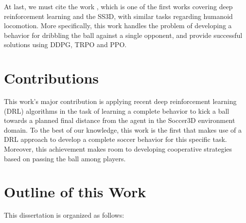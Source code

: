 At last, we must cite the work \cite{TGMuzio}, which is one of the first works covering deep reinforcement learning and the SS3D, with similar tasks regarding humanoid locomotion. More specifically, this work handles the problem of developing a behavior for dribbling the ball against a single opponent, and provide successful solutions using DDPG, TRPO and PPO.

\section{Contributions}

This work's major contribution is applying recent deep reinforcement learning (DRL) algorithms in the task of learning a complete behavior to kick a ball towards a planned final distance from the agent in the Soccer3D environment domain. To the best of our knowledge, this work is the first that makes use of a DRL approach to develop a complete soccer behavior for this specific task. Moreover, this achievement makes room to developing cooperative strategies based on passing the ball among players.

\section{Outline of this Work}

This dissertation is organized as follows:

